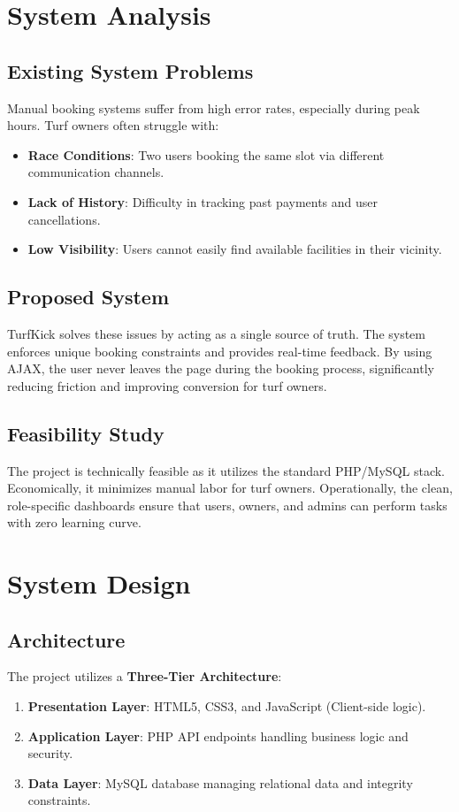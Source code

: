 \documentclass[12pt,a4paper]{report}
\begin{document}
\chapter{System Analysis}
\section{Existing System Problems}
Manual booking systems suffer from high error rates, especially during peak hours. Turf owners often struggle with:
\begin{itemize}
    \item \textbf{Race Conditions}: Two users booking the same slot via different communication channels.
    \item \textbf{Lack of History}: Difficulty in tracking past payments and user cancellations.
    \item \textbf{Low Visibility}: Users cannot easily find available facilities in their vicinity.
\end{itemize}

\section{Proposed System}
TurfKick solves these issues by acting as a single source of truth. The system enforces unique booking constraints and provides real-time feedback. By using AJAX, the user never leaves the page during the booking process, significantly reducing friction and improving conversion for turf owners.

\section{Feasibility Study}
The project is technically feasible as it utilizes the standard PHP/MySQL stack. Economically, it minimizes manual labor for turf owners. Operationally, the clean, role-specific dashboards ensure that users, owners, and admins can perform tasks with zero learning curve.

\chapter{System Design}
\section{Architecture}
The project utilizes a \textbf{Three-Tier Architecture}:
\begin{enumerate}
    \item \textbf{Presentation Layer}: HTML5, CSS3, and JavaScript (Client-side logic).
    \item \textbf{Application Layer}: PHP API endpoints handling business logic and security.
    \item \textbf{Data Layer}: MySQL database managing relational data and integrity constraints.
\end{enumerate}
\end{document}
